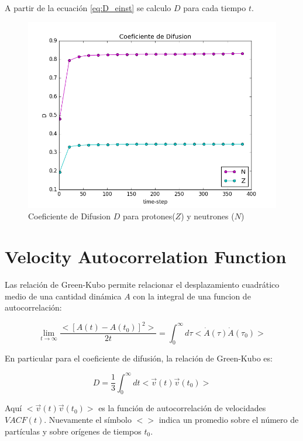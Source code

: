 \documentclass[
 reprint,
 amsmath,amssymb,
 aps,
 a4paper
]{revtex4-1}
\begin{document}
A partir de la ecuación \ref{eq:D_einst} se calculo $D$ para cada tiempo $t$.

\begin{figure}[H]
\centerline{
  \includegraphics[width=1.0\linewidth]{D_t400.png}}
  \caption{\small Coeficiente de Difusion $D$ para protones($Z$) y neutrones ($N$)}
  \label{fig:D_t400}
\end{figure}

\section{\label{seq:vaf}Velocity Autocorrelation Function}

Las relación de Green-Kubo permite relacionar el desplazamiento cuadrático medio de una cantidad dinámica $A$ con la integral de una funcion de autocorrelación:

 \begin{equation}\label{eq:GK}
 \lim_{t \to \infty} \frac{<[A(t)-A(t_0)]^2>}{2t}=\int_{0}^{\infty}d\tau<\dot{A}(\tau)\dot{A}(\tau_0)>
\end{equation}

En particular para el coeficiente de difusión, la relación de Green-Kubo es:

 \begin{equation}\label{eq:GK_D}
 D=\frac{1}{3}\int_{0}^{\infty}dt<\vec{v}(t)\vec{v}(t_0)>
\end{equation}

Aquí $<\vec{v}(t)\vec{v}(t_0)>$ es la función de autocorrelación de velocidades $VACF(t)$. Nuevamente el símbolo $<>$ indica un promedio sobre el número de partículas y sobre orígenes de tiempos $t_0$.
\end{document}
